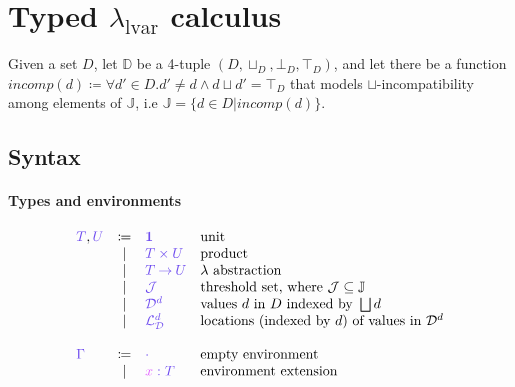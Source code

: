 \documentclass[main.tex]{subfiles}
\begin{document}
\section{Typed $\lambda_{\text{lvar}}$ calculus}

Given a set $D$, let $\mathbb{D}$ be a 4-tuple $(D, \sqcup_{D}, \bot_{D},
\top_{D})$, and let there be a function $incomp(d) \coloneqq \forall d' \in
D. d' \neq d \wedge d \sqcup d' = \top_{D}$ that models $\sqcup$-incompatibility among
elements of $\mathbb{J}$, i.e $\mathbb{J} = \{ d \in D \vert incomp(d) \}$.

\subsection{Syntax}
\label{sec:llam-syntax}

\paragraph{Types and environments}
\[
\begin{array}{lcll}
  \ty{T}, \ty{U}
  & \coloneqq & \ty{\tyunit}        & \text{unit} \\
  & \sep      & \ty{\typrod{T}{U}}  & \text{product} \\
  & \sep      & \ty{\tyfun{T}{U}}   & \lambda \text{ abstraction}\\
  & \sep      & \ty{\tyJ}           & \text{threshold set, where } \tyJ
                                      \subseteq \mathbb{J} \\
  & \sep      & \ty{\tyD{d}}        & \text{values } d \text{ in } D \text{ indexed by }
                                      \bigsqcup d\\
  & \sep      & \ty{\tyL{d}}        & \text{locations (indexed by } d \text{) of
                                      values in } \tyD{d}\\
  \\
  \ty{\Gamma}
  & \coloneqq & \ty{\emptyenv}                 & \text{empty environment}\\
  & \sep      & \ty{\tmty{x}{T}}               & \text{environment extension} \\
\end{array}
\]
\end{document}
